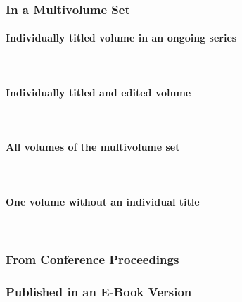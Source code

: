 \documentclass{ltxdockit}
\newcommand{\myparagraph}[1]{\paragraph{#1}\mbox{}\\}
\begin{document}
\subsubsection{In a Multivolume Set} %
\label{sub:in_a_multivolume_set}
\myparagraph{Individually titled volume in an ongoing series} %
\label{ssub:individually_titled_volume_in_an_ongoing_series}
\begin{refsection}
	\printbibliography[heading=none]
\end{refsection}
\myparagraph{Individually titled and edited volume} %
\label{ssub:individually_titled_and_edited_volume}
\begin{refsection}
	\printbibliography[heading=none]
\end{refsection}
\myparagraph{All volumes of the multivolume set} %
\label{ssub:all_volumes_of_the_multivolume_set}
\begin{refsection}
	\printbibliography[heading=none]
\end{refsection}
\myparagraph{One volume without an individual title} %
\label{ssub:one_volume_without_an_individual_title}
\begin{refsection}
	\printbibliography[heading=none]
\end{refsection}
\subsubsection{From Conference Proceedings} %
\label{sub:from_conference_proceedings}
\begin{refsection}
	\printbibliography[heading=none]
\end{refsection}
\subsubsection{Published in an E-Book Version} %
\label{sub:published_in_an_e_book_version}
\begin{refsection}
	\printbibliography[heading=none]
\end{refsection}
\end{document}
